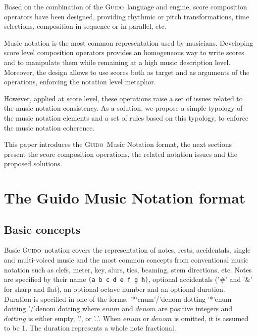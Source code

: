 \documentclass[twoside,10pt,a4paper]{article}
\newenvironment{gmncode}		{\vspace{-2mm}\small\verbatim}{\endverbatim\vspace{-2mm}}
\newcommand{\Guido}	{\textsc{Guido}}
\newcommand{\code}[1]	{{\small \texttt{#1}}}
\begin{document}
Based on the combination of the \Guido\ language and engine, score composition operators have been designed, providing rhythmic or pitch transformations, time selections, composition in sequence or in parallel, etc.

Music notation is the most common representation used by musicians. Developing score level composition operators provides an homogeneous way to write scores and to manipulate them while remaining at a high music description level. Moreover, the design allows to use scores both as target and as arguments of the operations, enforcing the notation level metaphor.

However, applied at score level, these operations raise a set of issues related to the music notation consistency. As a solution, we propose a simple typology of the music notation elements and a set of rules based on this typology, to enforce the music notation coherence.

This paper introduces the \Guido\ Music Notation format, the next sections present the score composition operations, the related notation issues and the proposed solutions.

\section{The Guido Music Notation format}

\subsection{Basic concepts}
Basic \Guido\ notation covers the representation of notes, rests, accidentals, single and multi-voiced music and the most common concepts from conventional music notation such as clefs, meter, key, slurs, ties, beaming, stem directions, etc.
Notes are specified by their name \code{(a b c d e f g h)}, optional accidentals ('\#' and '\&' for sharp and flat), an optional octave number and an optional duration. \\
Duration is specified in one of the forms: 
\begin{gmncode} 
   '*'enum'/'denom dotting
   '*'enum dotting 
   '/'denom dotting
\end{gmncode} 
\noindent where $enum$ and $denom$ are positive integers and $dotting$ is either empty, '.', or '..'. When $enum$ or $denom$ is omitted, it is assumed to be 1. The duration represents a whole note fractional.
\end{document}
